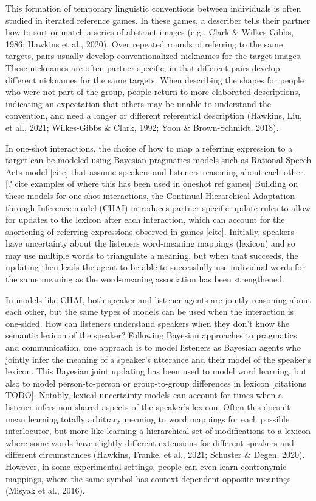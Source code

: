 \documentclass[10pt, letterpaper]{article}
\begin{document}
This formation of temporary linguistic conventions between individuals
is often studied in iterated reference games. In these games, a
describer tells their partner how to sort or match a series of abstract
images (e.g., Clark \& Wilkes-Gibbs, 1986; Hawkins et al., 2020). Over
repeated rounds of referring to the same targets, pairs usually develop
conventionalized nicknames for the target images. These nicknames are
often partner-specific, in that different pairs develop different
nicknames for the same targets. When describing the shapes for people
who were not part of the group, people return to more elaborated
descriptions, indicating an expectation that others may be unable to
understand the convention, and need a longer or different referential
description (Hawkins, Liu, et al., 2021; Wilkes-Gibbs \& Clark, 1992;
Yoon \& Brown-Schmidt, 2018).

In one-shot interactions, the choice of how to map a referring
expression to a target can be modeled using Bayesian pragmatics models
such as Rational Speech Acts model {[}cite{]} that assume speakers and
listeners reasoning about each other. {[}? cite examples of where this
has been used in oneshot ref games{]} Building on these models for
one-shot interactions, the Continual Hierarchical Adaptation through
Inference model (CHAI) introduces partner-specific update rules to allow
for updates to the lexicon after each interaction, which can account for
the shortening of referring expressions observed in games {[}cite{]}.
Initially, speakers have uncertainty about the listeners word-meaning
mappings (lexicon) and so may use multiple words to triangulate a
meaning, but when that succeeds, the updating then leads the agent to be
able to successfully use individual words for the same meaning as the
word-meaning association has been strengthened.

In models like CHAI, both speaker and listener agents are jointly
reasoning about each other, but the same types of models can be used
when the interaction is one-sided. How can listeners understand speakers
when they don't know the semantic lexicon of the speaker? Following
Bayesian approaches to pragmatics and communication, one approach is to
model listeners as Bayesian agents who jointly infer the meaning of a
speaker's utterance and their model of the speaker's lexicon. This
Bayesian joint updating has been used to model word learning, but also
to model person-to-person or group-to-group differences in lexicon
{[}citations TODO{]}. Notably, lexical uncertainty models can account
for times when a listener infers non-shared aspects of the speaker's
lexicon. Often this doesn't mean learning totally arbitrary meaning to
word mappings for each possible interlocutor, but more like learning a
hierarchical set of modifications to a lexicon where some words have
slightly different extensions for different speakers and different
circumstances (Hawkins, Franke, et al., 2021; Schuster \& Degen, 2020).
However, in some experimental settings, people can even learn
contronymic mappings, where the same symbol has context-dependent
opposite meanings (Misyak et al., 2016).
\end{document}
